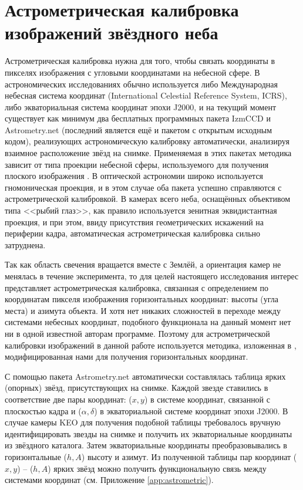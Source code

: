 \documentclass[12pt,a4paper]{article}
\begin{document}
\section{Астрометрическая калибровка изображений звёздного неба} \label{sec:astro_cal}
Астрометрическая калибровка нужна для того, чтобы связать координаты в пикселях изображения с угловыми координатами на небесной сфере. В астрономических исследованиях обычно используется либо Международная небесная система координат (International Celestial Reference System, ICRS), либо экваториальная система координат эпохи J2000, и на текущий момент существует как минимум два бесплатных программных пакета IzmCCD \cite{Izmccd,Izmailov2010} и Astrometry.net \cite{Astrometry.net, Lang2010} (последний является ещё и пакетом с открытым исходным кодом), реализующих астрономическую калибровку автоматически, анализируя взаимное расположение звёзд на снимке. Применяемая в этих пакетах методика зависит от типа проекции небесной сферы, используемого для получения плоского изображения \cite{Calabretta2002}. В оптической астрономии широко используется гномоническая проекция, и в этом случае оба пакета успешно справляются с астрометрической калибровкой. В камерах всего неба, оснащённых объективом типа <<рыбий глаз>>, как правило используется зенитная эквидистантная проекция, и при этом, ввиду присутствия геометрических искажений на периферии кадра, автоматическая астрометрическая калибровка сильно затруднена.

Так как область свечения вращается вместе с Землёй, а ориентация камер не менялась в течение эксперимента, то для целей настоящего исследования интерес представляет астрометрическая калибровка, связанная с определением по координатам пикселя изображения горизонтальных координат: высоты (угла места) и азимута объекта. И хотя нет никаких сложностей в переходе между системами небесных координат, подобного функционала на данный момент нет ни в одной известной авторам программе. Поэтому для астрометрической калибровки изображений в данной работе используется методика, изложенная в \cite{Montenbruck2000}, модифицированная нами для получения горизонтальных координат.

С помощью пакета Astrometry.net автоматически составлялась таблица ярких (опорных) звёзд, присутствующих на снимке. Каждой звезде ставились в соответствие две пары координат: ($x,y$) в системе координат, связанной с плоскостью кадра и ($\alpha, \delta$) в экваториальной системе координат эпохи J2000. В случае камеры KEO для получения подобной таблицы требовалось вручную идентифицировать звезды на снимке и получить их экваториальные координаты из звёздного каталога. Затем экваториальные координаты преобразовывались в горизонтальные ($h,A$) высоту и азимут. Из полученной таблицы пар координат ($x,y$) -- ($h,A$) ярких звёзд можно получить функциональную связь между системами координат (см. Приложение \ref{app:astrometric}).
\end{document}
